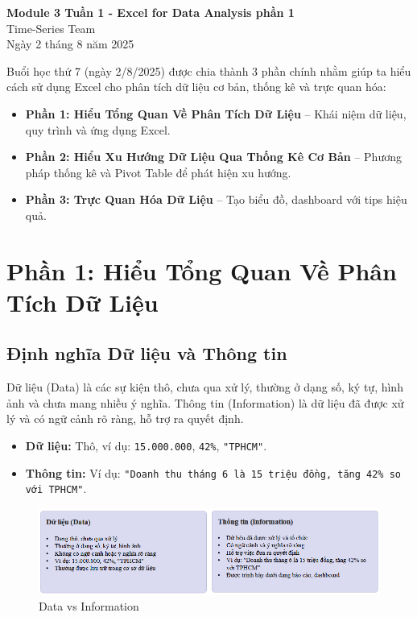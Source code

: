 \documentclass[11pt]{article}
\renewcommand{\maketitle}{%
    \begin{center}
        \fontsize{18}{20}\selectfont\textbf{Module 3 Tuần 1 - Excel for Data Analysis phần 1}\\[1em]
        \fontsize{14}{16}\selectfont Time-Series Team\\[0.5em]
        \fontsize{14}{16}\selectfont Ngày 2 tháng 8 năm 2025
    \end{center}
    \vspace{1.5em}
}
\begin{document}
\maketitle

\begin{summarybox}
Buổi học thứ 7 (ngày 2/8/2025) được chia thành 3 phần chính nhằm giúp ta hiểu cách sử dụng Excel cho phân tích dữ liệu cơ bản, thống kê và trực quan hóa:
\begin{itemize}
    \item \textbf{Phần 1: Hiểu Tổng Quan Về Phân Tích Dữ Liệu} – Khái niệm dữ liệu, quy trình và ứng dụng Excel.
    \item \textbf{Phần 2: Hiểu Xu Hướng Dữ Liệu Qua Thống Kê Cơ Bản} – Phương pháp thống kê và Pivot Table để phát hiện xu hướng.
    \item \textbf{Phần 3: Trực Quan Hóa Dữ Liệu} – Tạo biểu đồ, dashboard với tips hiệu quả.
\end{itemize}
\end{summarybox}
\section{Phần 1: Hiểu Tổng Quan Về Phân Tích Dữ Liệu}

\subsection{Định nghĩa Dữ liệu và Thông tin}
Dữ liệu (Data) là các sự kiện thô, chưa qua xử lý, thường ở dạng số, ký tự, hình ảnh và chưa mang nhiều ý nghĩa.
Thông tin (Information) là dữ liệu đã được xử lý và có ngữ cảnh rõ ràng, hỗ trợ ra quyết định.

\begin{itemize}
    \item \textbf{Dữ liệu:} Thô, ví dụ: \texttt{15.000.000}, \texttt{42\%}, \texttt{"TPHCM"}.
    \item \textbf{Thông tin:} Ví dụ: \texttt{"Doanh thu tháng 6 là 15 triệu đồng, tăng 42\% so với TPHCM"}.
\end{itemize}

\begin{figure}[H]
    \centering
    \includegraphics[width=1\linewidth]{images/data_vs_infor.png}
    \caption{Data vs Information}
    \label{fig:data_vs_info}
\end{figure}
\end{document}
